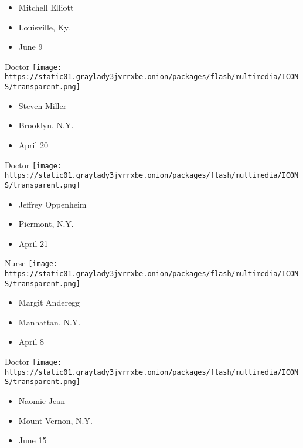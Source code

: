 \begin{itemize}
\tightlist
\item
  Mitchell Elliott
\item
  Louisville, Ky.
\item
  June 9
\end{itemize}

\protect\hyperlink{item-steven-miller}{}

Doctor
\texttt{[image: https://static01.graylady3jvrrxbe.onion/packages/flash/multimedia/ICONS/transparent.png]}

\begin{itemize}
\tightlist
\item
  Steven Miller
\item
  Brooklyn, N.Y.
\item
  April 20
\end{itemize}

\protect\hyperlink{item-jeffrey-oppenheim}{}

Doctor
\texttt{[image: https://static01.graylady3jvrrxbe.onion/packages/flash/multimedia/ICONS/transparent.png]}

\begin{itemize}
\tightlist
\item
  Jeffrey Oppenheim
\item
  Piermont, N.Y.
\item
  April 21
\end{itemize}

\protect\hyperlink{item-margit-anderegg}{}

Nurse
\texttt{[image: https://static01.graylady3jvrrxbe.onion/packages/flash/multimedia/ICONS/transparent.png]}

\begin{itemize}
\tightlist
\item
  Margit Anderegg
\item
  Manhattan, N.Y.
\item
  April 8
\end{itemize}

\protect\hyperlink{item-naomie-jean}{}

Doctor
\texttt{[image: https://static01.graylady3jvrrxbe.onion/packages/flash/multimedia/ICONS/transparent.png]}

\begin{itemize}
\tightlist
\item
  Naomie Jean
\item
  Mount Vernon, N.Y.
\item
  June 15
\end{itemize}

